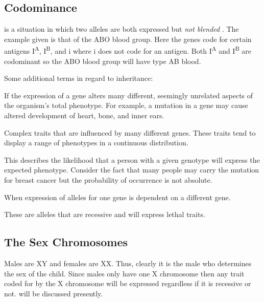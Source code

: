 \documentclass[../Bio_chemistryReview.tex]{subfiles}
\begin{document}
\subsection{Codominance}
 is a situation in which two alleles are both expressed but
\textit{ not blended }. The example given is that of the ABO blood group. Here
the genes code for certain antigens I\textsuperscript{A},
I\textsuperscript{B}, and i where i does not code for an antigen. Both
I\textsuperscript{A} and I\textsuperscript{B} are codominant so the ABO blood
group will have type AB blood.\par

Some additional terms in regard to inheritance:
\begin{infobox}
\begin{description}
  \item {} If the expression of a gene alters many
    different, seemingly unrelated aspects of the organism's total phenotype.
    For example, a mutation in a gene may cause altered development of heart,
    bone, and inner ears.
  \item {} Complex traits that are influenced by many different
    genes. These traits tend to display a range of phenotypes in a continuous
    distribution.
  \item {} This describes the likelihood that a person with a
    given genotype will express the expected phenotype. Consider the fact that
    many people may carry the mutation for breast cancer but the probability of
    occurrence is not absolute.
  \item {} When expression of alleles for one gene is dependent
    on a different gene.
  \item {} These are alleles that are recessive
    and will express lethal traits. 
\end{description}
\end{infobox}

\subsection{The Sex Chromosomes}
Males are XY and females are XX. Thus, clearly it is the male who determines
the sex of the child. Since males only have one X chromosome then any trait
coded for by the X chromosome will be expressed regardless if it is recessive or
not.  will be discussed presently.
\end{document}
